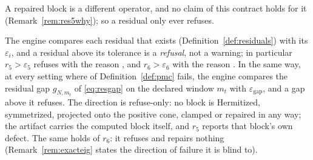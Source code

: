 
A repaired block is a different operator, and no claim of this contract holds
for it (Remark~\ref{rem:res5why}); so a residual only ever refuses.

\begin{requirement}\label{req:residual-refusal}
The engine compares each residual that exists (Definition~\ref{def:residuals})
with its  $\varepsilon_i$, and a
residual above its tolerance is a \emph{refusal}, not a warning; in particular
$r_5>\varepsilon_5$ refuses with the reason
, and
$r_6>\varepsilon_6$ with the reason
. In the same
way, at every setting where  of
Definition~\ref{def:pmc} fails, the engine compares the residual gap
$g_{N,m_t}$ of \eqref{eq:resgap} on the declared window $m_t$ with
$\varepsilon_{\mathrm{gap}}$, and a gap above it refuses. The direction
is refuse-only: no block is Hermitized, symmetrized, projected onto the
positive cone, clamped or repaired in any way; the artifact carries the
computed block itself, and $r_5$ reports that block's own defect. The same
holds of $r_6$: it refuses and repairs nothing (Remark~\ref{rem:exacteig}
states the direction of failure it is blind to).
\end{requirement}
